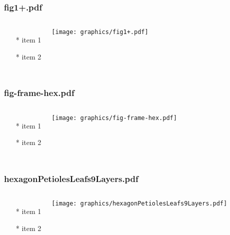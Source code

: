 \documentclass{beamer}
\begin{document}
\begin{frame} \frametitle{fig1+.pdf}
    \begin{columns}[c]
        \begin{itemize}
            \item[*] item 1
            \item[*] item 2
        \end{itemize}
        \begin{minipage}{\linewidth}
            \begin{center}
            \texttt{[image: graphics/fig1+.pdf]}
            \label{gfx:fig1+.pdf}
            \end{center}
        \end{minipage}
    \end{columns}
\end{frame}

\begin{frame} \frametitle{fig-frame-hex.pdf}
    \begin{columns}[c]
        \begin{itemize}
            \item[*] item 1
            \item[*] item 2
        \end{itemize}
        \begin{minipage}{\linewidth}
            \begin{center}
            \texttt{[image: graphics/fig-frame-hex.pdf]}
            \label{gfx:fig-frame-hex.pdf}
            \end{center}
        \end{minipage}
    \end{columns}
\end{frame}

\begin{frame} \frametitle{hexagonPetiolesLeafs9Layers.pdf}
    \begin{columns}[c]
        \begin{itemize}
            \item[*] item 1
            \item[*] item 2
        \end{itemize}
        \begin{minipage}{\linewidth}
            \begin{center}
            \texttt{[image: graphics/hexagonPetiolesLeafs9Layers.pdf]}
            \label{gfx:hexagonPetiolesLeafs9Layers.pdf}
            \end{center}
        \end{minipage}
    \end{columns}
\end{frame}
\end{document}
